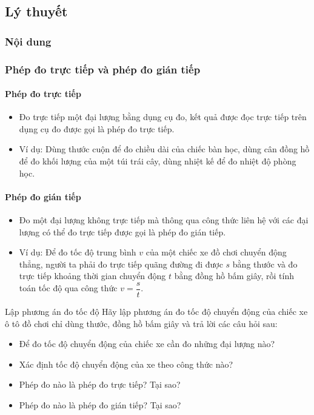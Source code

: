 


\subsection{Lý thuyết}
\subsubsection{Nội dung}
\subsubsection{Phép đo trực tiếp và phép đo gián tiếp}
\paragraph{Phép đo trực tiếp}
\begin{itemize}
\item Đo trực tiếp một đại lượng bằng dụng cụ đo, kết quả được đọc trực tiếp trên dụng cụ đo được gọi là phép đo trực tiếp.
\item Ví dụ: Dùng thước cuộn để đo chiều dài của chiếc bàn học, dùng cân đồng hồ để đo khối lượng của một túi trái cây, dùng nhiệt kế để đo nhiệt độ phòng học.
\end{itemize}
\paragraph{Phép đo gián tiếp}
\begin{itemize}
\item Đo một đại lượng không trực tiếp mà thông qua công thức liên hệ với các đại lượng có thể đo trực tiếp được gọi là phép đo gián tiếp.
\item Ví dụ: Để đo tốc độ trung bình $v$ của một chiếc xe đồ chơi chuyển động thẳng, người ta phải đo trực tiếp quãng đường đi được $s$ bằng thước và đo trực tiếp khoảng thời gian chuyển động $t$ bằng đồng hồ bấm giây, rồi tính toán tốc độ qua công thức $v = \dfrac{s}{t}$.
\end{itemize}
\begin{hoatdong}{Lập phương án đo tốc độ}
Hãy lập phương án đo tốc độ chuyển động của chiếc xe ô tô đồ chơi chỉ dùng thước, đồng hồ bấm giây và trả lời các câu hỏi sau:
\begin{itemize}
\item Để đo tốc độ chuyển động của chiếc xe cần đo những đại lượng nào?
\item Xác định tốc độ chuyển động của xe theo công thức nào?
\item Phép đo nào là phép đo trực tiếp? Tại sao?
\item Phép đo nào là phép đo gián tiếp? Tại sao?
\end{itemize}
\end{hoatdong}
